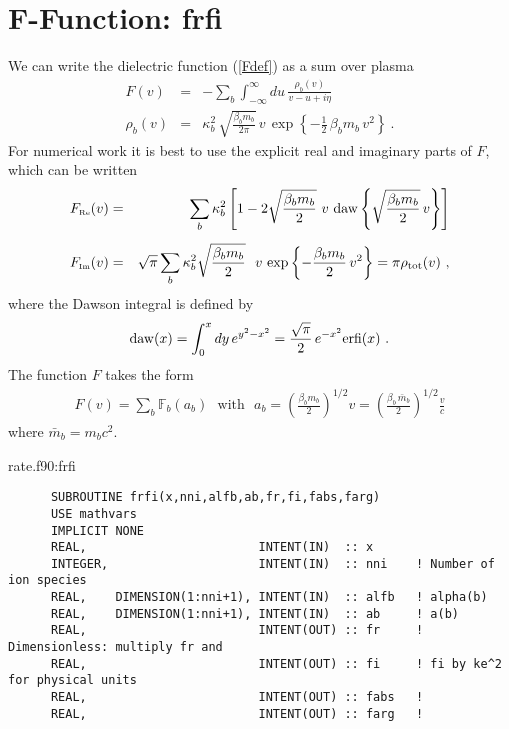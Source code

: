 \documentclass[preprint,12pt,eqsecnum,nofootinbib,amsmath,amssymb]{revtex4}
\newcommand{\smRe}{{\rm\scriptscriptstyle Re}}
\newcommand{\smIm}{{\rm\scriptscriptstyle Im}}
\begin{document}
{{{{{{{%
\pagebreak
\section{F-Function: \lowercase{frfi}}

We can write the dielectric function (\ref{Fdef}) as a sum over plasma
\begin{eqnarray}
  F(v) 
  &=& 
\label{Fbdef2}
  -{\sum}_b\int_{-\infty}^\infty du\, \frac{\rho_b(v)}{v - u + i\eta}
\\[5pt]
  \rho_b(v) 
  &=& 
  \kappa_b^2\,\sqrt{\frac{\beta_b m_b}{2\pi}}\, v\,
  \exp\!\left\{-\frac{1}{2}\,\beta_b m_b\, v^2\right\} \ .
\label{barrhob2}
\end{eqnarray} 
For numerical work it is best to use the
explicit real and imaginary parts of $F$, which can be written
\begin{eqnarray}
  F_\smRe(v)
  &=& 
  \sum_b \kappa_b^2 
  \left[1 - 2 \sqrt{\frac{\beta_b m_b}{2}} ~v~
  {\rm daw}\left\{\sqrt{\frac{\beta_b m_b}{2}}\,v 
  \right\} \right]
\label{Fru2}
\\[5pt]
  F_\smIm(v)
  &=&
  \sqrt{\pi} \sum_b \kappa_b^2 
  \sqrt{\frac{\beta_b m_b}{2}}~~
  v\, \exp\left\{-\frac{\beta_b m_b}
  {2}\, v^2\right\} = \pi  \rho_{\rm tot}(v)  \ ,
\label{Fiu2}
\end{eqnarray}
where the Dawson integral is defined by 
  \begin{eqnarray}
  {\rm daw}(x) = \int_0^x dy\, 
  e^{y^2 - x^2} = \frac{\sqrt{\pi}}{2}\, e^{-x^2}
  {\rm erfi}(x) \ .
  \end{eqnarray}
The function $F$ takes the form
\begin{eqnarray}
  F(v) = {\sum}_b\mathbb{F}_b\left(a_b \right) 
  ~~~\text{with}~~~ 
  a_b = \left( \frac{\beta_b m_b}{2}\right)^{1/2} \!v
  =
  \left( \frac{\beta_b\, \bar m_b}{2}\right)^{1/2}\frac{v}{c}
\end{eqnarray}
\noindent
where $\bar m_b = m_b c^2$.  


\vskip0.4cm 
\noindent
rate.f90:frfi
{
\baselineskip 10pt
\begin{verbatim}
      SUBROUTINE frfi(x,nni,alfb,ab,fr,fi,fabs,farg) 
      USE mathvars
      IMPLICIT NONE
      REAL,                        INTENT(IN)  :: x
      INTEGER,                     INTENT(IN)  :: nni    ! Number of ion species
      REAL,    DIMENSION(1:nni+1), INTENT(IN)  :: alfb   ! alpha(b)
      REAL,    DIMENSION(1:nni+1), INTENT(IN)  :: ab     ! a(b)
      REAL,                        INTENT(OUT) :: fr     ! Dimensionless: multiply fr and
      REAL,                        INTENT(OUT) :: fi     ! fi by ke^2 for physical units
      REAL,                        INTENT(OUT) :: fabs   !
      REAL,                        INTENT(OUT) :: farg   !


\end{verbatim}}}}}}}}}
\end{document}
